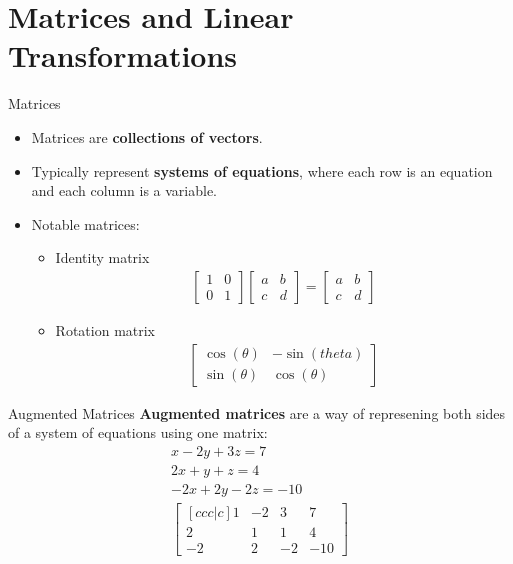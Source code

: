 \section{Matrices and Linear Transformations}

\begin{frame}{Matrices}
    \begin{itemize}
        \item Matrices are \textbf{collections of vectors}.
        \item Typically represent \textbf{systems of equations}, where each row is an equation and each column is a variable.
        \item Notable matrices:
        \begin{itemize}
            \item Identity matrix
            \begin{align*}
                \begin{bmatrix}
                    1 & 0 \\
                    0 & 1
                \end{bmatrix}
                \begin{bmatrix}
                    a & b \\
                    c & d
                \end{bmatrix} =
                \begin{bmatrix}
                    a & b \\
                    c & d
                \end{bmatrix} 
            \end{align*}
            \item Rotation matrix
            \begin{align*}
                \begin{bmatrix}
                    \cos(\theta) & -\sin(theta) \\
                    \sin(\theta) & \cos(\theta)
                \end{bmatrix}
            \end{align*}
        \end{itemize}
    \end{itemize}
\end{frame}

\begin{frame}{Augmented Matrices}
    \textbf{Augmented matrices} are a way of represening both sides of a system of equations using one matrix:
    \begin{align*}
        x - 2y + 3z = 7 \\
        2x + y + z = 4 \\
        -2x + 2y -2z = -10 \\
        \begin{bmatrix}[c c c | c]
            1 & -2 & 3 & 7 \\
            2 & 1 & 1 & 4 \\
            -2 & 2 & -2 & -10
        \end{bmatrix}
    \end{align*}
\end{frame}